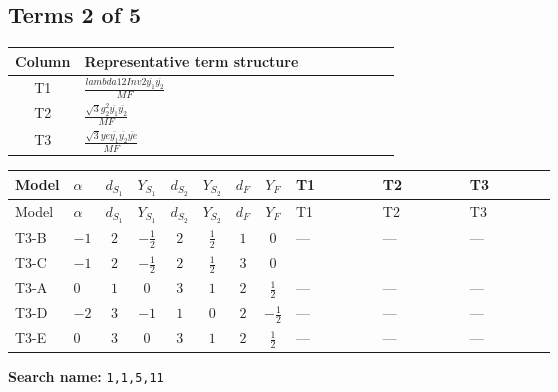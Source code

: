 \documentclass[8pt]{article}
\begin{document}
\begin{landscape}
\subsection*{Terms 2 of 5}
\begin{center}
\begin{tabular}{@{}c >{\raggedright\arraybackslash}p{0.82\linewidth}@{}}
\toprule
Column & Representative term structure \\
\midrule
T1 & \(\displaystyle \frac{lambda12Inv2 \overline{y_{1}} \overline{y_{2}}}{MF}\) \\
\midrule
T2 & \(\displaystyle \frac{\sqrt{3} g_{2}^{2} \overline{y_{1}} \overline{y_{2}}}{MF}\) \\
\midrule
T3 & \(\displaystyle \frac{\sqrt{3} ye \overline{y_{1}} \overline{y_{2}} \overline{ye}}{MF}\) \\
\midrule
\bottomrule
\end{tabular}
\end{center}
\smallskip
\tiny
\begin{longtable}{@{}llcccccc >{\raggedright\arraybackslash}p{0.21\linewidth} >{\raggedright\arraybackslash}p{0.21\linewidth} >{\raggedright\arraybackslash}p{0.21\linewidth}@{}}
\toprule
Model & $\alpha$ & $d_{S_1}$ & $Y_{S_1}$ & $d_{S_2}$ & $Y_{S_2}$ & $d_F$ & $Y_F$ & T1 & T2 & T3 \\
\midrule
\endfirsthead
\toprule
Model & $\alpha$ & $d_{S_1}$ & $Y_{S_1}$ & $d_{S_2}$ & $Y_{S_2}$ & $d_F$ & $Y_F$ & T1 & T2 & T3 \\
\midrule
\endhead
T3-B & $-1$ & $2$ & $-\frac{1}{2}$ & $2$ & $\frac{1}{2}$ & $1$ & $0$ & --- & --- & --- \\
\midrule
T3-C & $-1$ & $2$ & $-\frac{1}{2}$ & $2$ & $\frac{1}{2}$ & $3$ & $0$ & \scriptsize\adjustbox{max width=\linewidth}{$\begin{gathered} \frac{lambda12Inv2 \overline{y_{1}} \overline{y_{2}}}{3 MF}\end{gathered}$} & \scriptsize\adjustbox{max width=\linewidth}{$\begin{gathered} \frac{\sqrt{3} g_{2}^{2} \overline{y_{1}} \overline{y_{2}}}{4 MF}\end{gathered}$} & \scriptsize\adjustbox{max width=\linewidth}{$\begin{gathered} - \frac{\sqrt{3} ye \overline{y_{1}} \overline{y_{2}} \overline{ye}}{12 MF}\end{gathered}$} \\
\midrule
T3-A & $0$ & $1$ & $0$ & $3$ & $1$ & $2$ & $\frac{1}{2}$ & --- & --- & --- \\
\midrule
T3-D & $-2$ & $3$ & $-1$ & $1$ & $0$ & $2$ & $-\frac{1}{2}$ & --- & --- & --- \\
\midrule
T3-E & $0$ & $3$ & $0$ & $3$ & $1$ & $2$ & $\frac{1}{2}$ & --- & --- & --- \\
\midrule
\bottomrule
\end{longtable}
\clearpage
\noindent\textbf{Search name: }\texttt{1,1,5,11}\par\smallskip

\end{landscape}
\end{document}
